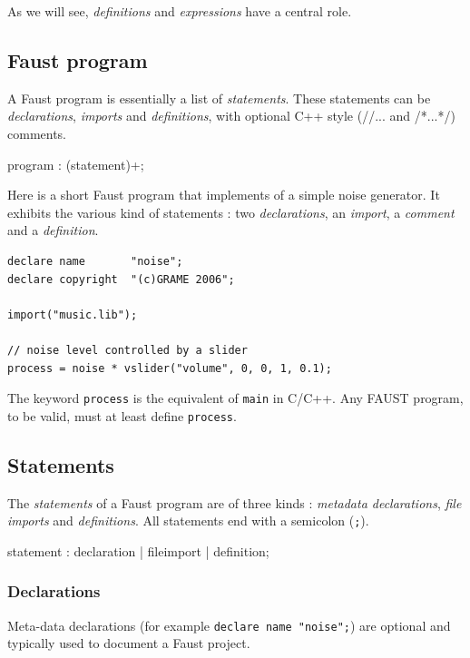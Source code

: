 \documentclass{article}
\begin{document}
As we will see, \textit{definitions} and \textit{expressions} have a central role.

\subsection{Faust program}

A Faust program is essentially a list of \textit{statements}. These statements can be \textit{declarations}, \textit{imports} and \textit{definitions}, with optional C++ style (//... and /*...*/) comments.
 
\begin{rail}
program : (statement)+;
\end{rail}

Here is a short Faust program that implements of a simple noise generator. It exhibits the various kind of statements : two \textit{declarations}, an \textit{import}, a \textit{comment} and a \textit{definition}.

\begin{lstlisting}
declare name       "noise";
declare copyright  "(c)GRAME 2006";

import("music.lib");

// noise level controlled by a slider
process = noise * vslider("volume", 0, 0, 1, 0.1);
\end{lstlisting}
 
The keyword \lstinline'process' is the equivalent of \lstinline'main' in C/C++. Any FAUST program, to be valid, must at least define \lstinline'process'.

\subsection{Statements}

The \textit{statements} of a Faust program are of three kinds : \textit{metadata declarations}, \textit{file imports} and \textit{definitions}. All statements end with a semicolon (\lstinline';'). 

\begin{rail}
statement : declaration | fileimport | definition;
\end{rail}



\subsubsection{Declarations}

Meta-data declarations (for example \lstinline'declare name "noise";') are optional and typically used to document a Faust project. 
\end{document}
